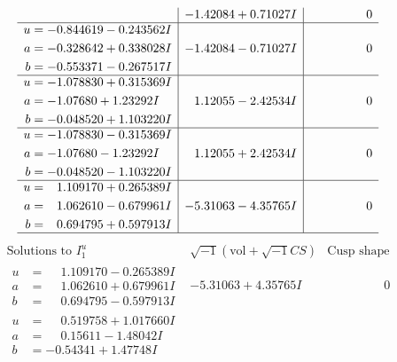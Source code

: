 \documentclass[1p]{elsarticle_modified}
\theoremstyle{definition}
\newcommand{\I}{\sqrt{-1}}
\begin{document}
$$\begin{array}{c|c|c}
 & -1.42084 + 0.71027 I & \phantom{-0.000000 } 0 \\ \hline\begin{aligned}
u &= -0.844619 - 0.243562 I \\
a &= -0.328642 + 0.338028 I \\
b &= -0.553371 - 0.267517 I\end{aligned}
 & -1.42084 - 0.71027 I & \phantom{-0.000000 } 0 \\ \hline\begin{aligned}
u &= -1.078830 + 0.315369 I \\
a &= -1.07680 + 1.23292 I \\
b &= -0.048520 + 1.103220 I\end{aligned}
 & \phantom{-}1.12055 - 2.42534 I & \phantom{-0.000000 } 0 \\ \hline\begin{aligned}
u &= -1.078830 - 0.315369 I \\
a &= -1.07680 - 1.23292 I \\
b &= -0.048520 - 1.103220 I\end{aligned}
 & \phantom{-}1.12055 + 2.42534 I & \phantom{-0.000000 } 0 \\ \hline\begin{aligned}
u &= \phantom{-}1.109170 + 0.265389 I \\
a &= \phantom{-}1.062610 - 0.679961 I \\
b &= \phantom{-}0.694795 + 0.597913 I\end{aligned}
 & -5.31063 - 4.35765 I & \phantom{-0.000000 } 0\\
 \hline 
 \end{array}$$\newpage$$\begin{array}{c|c|c}  
\text{Solutions to }I^u_{1}& \I (\text{vol} + \sqrt{-1}CS) & \text{Cusp shape}\\
 \hline 
\begin{aligned}
u &= \phantom{-}1.109170 - 0.265389 I \\
a &= \phantom{-}1.062610 + 0.679961 I \\
b &= \phantom{-}0.694795 - 0.597913 I\end{aligned}
 & -5.31063 + 4.35765 I & \phantom{-0.000000 } 0 \\ \hline\begin{aligned}
u &= \phantom{-}0.519758 + 1.017660 I \\
a &= \phantom{-}0.15611 - 1.48042 I \\
b &= -0.54341 + 1.47748 I\end{aligned}

\end{array}$$
\end{document}
